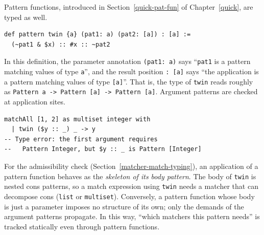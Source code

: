 Pattern functions, introduced in Section~\ref{quick-pat-fun} of Chapter~\ref{quick}, are typed as well.
\begin{lstlisting}[language=egison,numbers=none]
def pattern twin {a} (pat1: a) (pat2: [a]) : [a] :=
  (~pat1 & $x) :: #x :: ~pat2
\end{lstlisting}
In this definition, the parameter annotation \lstinline{(pat1: a)} says ``\lstinline{pat1} is a pattern matching values of type \lstinline{a}'', and the result position \lstinline{: [a]} says ``the application is a pattern matching values of type \lstinline{[a]}''.
That is, the type of \lstinline{twin} reads roughly as \lstinline{Pattern a -> Pattern [a] -> Pattern [a]}.
Argument patterns are checked at application sites.
\begin{lstlisting}[language=egison,numbers=none]
matchAll [1, 2] as multiset integer with
  | twin ($y :: _) _ -> y
-- Type error: the first argument requires
--   Pattern Integer, but $y :: _ is Pattern [Integer]
\end{lstlisting}

For the admissibility check (Section~\ref{matcher-match-typing}), an application of a pattern function behaves as the \emph{skeleton of its body pattern}.
The body of \lstinline{twin} is nested cons patterns, so a match expression using \lstinline{twin} needs a matcher that can decompose cons (\lstinline{list} or \lstinline{multiset}).
Conversely, a pattern function whose body is just a parameter imposes no structure of its own; only the demands of the argument patterns propagate.
In this way, ``which matchers this pattern needs'' is tracked statically even through pattern functions.
